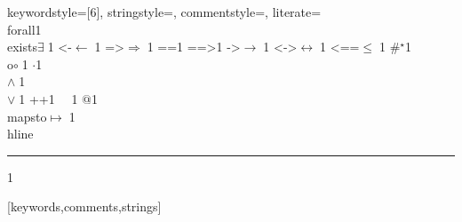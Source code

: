 {  keywordstyle=[6]\color{cRed},
  stringstyle=\ttfamily,
  commentstyle={\ttfamily\color{dkgreen}},
  literate=
    {\\forall}{{\color{dkgreen}{$\forall\;$}}}1
    {\\exists}{{$\exists\;$}}1
    {<-}{{$\leftarrow\;$}}1
    {=>}{{$\Rightarrow\;$}}1
    {==}{{\code{==}\;}}1
    {==>}{{\code{==>}\;}}1
    {->}{{$\rightarrow\;$}}1
    {<->}{{$\leftrightarrow\;$}}1
    {<==}{{$\leq\;$}}1
    {\#}{{$^\star$}}1 
    {\\o}{{$\circ\;$}}1 
    {\@}{{$\cdot$}}1 
    {\/\\}{{$\wedge\;$}}1
    {\\\/}{{$\vee\;$}}1
    {++}{{\code{++}}}1
    {~}{{\ }}1
    {\@\@}{{$@$}}1
    {\\mapsto}{{$\mapsto\;$}}1
    {\\hline}{{\rule{\linewidth}{0.5pt}}}1
  }[keywords,comments,strings]

